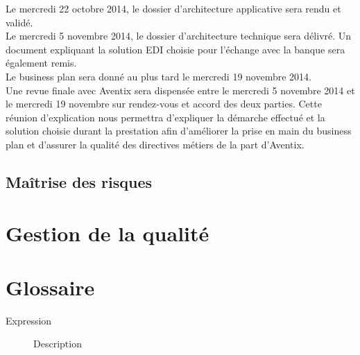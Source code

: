 \documentclass[11pt, a4paper]{article}
\begin{document}
Le mercredi 22 octobre 2014, le dossier d'architecture applicative sera rendu
et validé. \\

Le mercredi 5 novembre 2014, le dossier d'architecture technique sera délivré.
Un document expliquant la solution EDI choisie pour l'échange avec la banque
sera également remis. \\

Le business plan sera donné au plus tard le mercredi 19 novembre 2014. \\

Une revue finale avec Aventix sera dispensée entre le mercredi 5 novembre 2014
et le mercredi 19 novembre sur rendez-vous et accord des deux parties.
Cette réunion d'explication nous permettra d'expliquer la démarche effectué et
la solution choisie durant la prestation afin d'améliorer la prise en main du
business plan et d'assurer la qualité des directives métiers de la part
d'Aventix. \\

\subsection{Maîtrise des risques}

\section{Gestion de la qualité}

\section{Glossaire}

\begin{description}
  \item[Expression] Description
\end{description}
\end{document}
